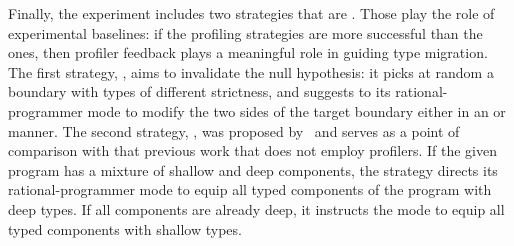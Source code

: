  Finally, the experiment includes two strategies that are \agnostickw{}.
 Those play the role of experimental baselines: if the profiling
 strategies are more successful than the \agnostickw{} ones, then profiler
 feedback plays a meaningful role in guiding type migration.  The first
 \agnostickw{} strategy, \randkw{}, aims to invalidate the null
 hypothesis: it picks at random  a boundary with types of different
 strictness, and suggests to its rational-programmer mode to modify the
 two sides of the target boundary either in an \optkw{} or \conkw{}
 manner.  The second \agnostickw{} strategy, \togglekw{}, was proposed
 by~\citep{g-deep-shallow} and serves as a point of comparison with that previous
 work that does not employ profilers. If the given program has a mixture
 of shallow and deep components, the strategy directs its
 rational-programmer mode to equip all typed components of the program
 with deep types. If all components are already deep, it instructs the
 mode to equip all typed components with shallow types. 

